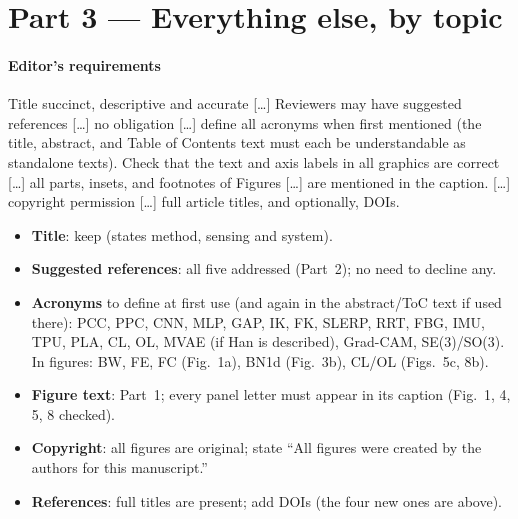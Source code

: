 \documentclass[10pt,a4paper]{article}
\begin{document}
\clearpage
\part*{Part 3 --- Everything else, by topic}
\setcounter{section}{3}\setcounter{subsection}{0}
\renewcommand{\thesubsection}{3.\arabic{subsection}}

\subsection{Editor's requirements}\label{sec:editor}
\begin{rev}[Editor]
Title succinct, descriptive and accurate [\dots] Reviewers may have suggested references [\dots] no obligation [\dots] define all acronyms when first mentioned (the title, abstract, and Table of Contents text must each be understandable as standalone texts). Check that the text and axis labels in all graphics are correct [\dots] all parts, insets, and footnotes of Figures [\dots] are mentioned in the caption. [\dots] copyright permission [\dots] full article titles, and optionally, DOIs.
\end{rev}
\begin{todo}
\begin{itemize}
\item \textbf{Title}: keep (states method, sensing and system).
\item \textbf{Suggested references}: all five addressed (Part~2); no need to decline any.
\item \textbf{Acronyms} to define at first use (and again in the abstract/ToC text if used there): PCC, PPC, CNN, MLP, GAP, IK, FK, SLERP, RRT, FBG, IMU, TPU, PLA, CL, OL, MVAE (if Han is described), Grad-CAM, SE(3)/SO(3). In figures: BW, FE, FC (Fig.~1a), BN1d (Fig.~3b), CL/OL (Figs.~5c, 8b).
\item \textbf{Figure text}: Part~1; every panel letter must appear in its caption (Fig.~1, 4, 5, 8 checked).
\item \textbf{Copyright}: all figures are original; state ``All figures were created by the authors for this manuscript.''
\item \textbf{References}: full titles are present; add DOIs (the four new ones are above).
\end{itemize}
\end{todo}
\end{document}
